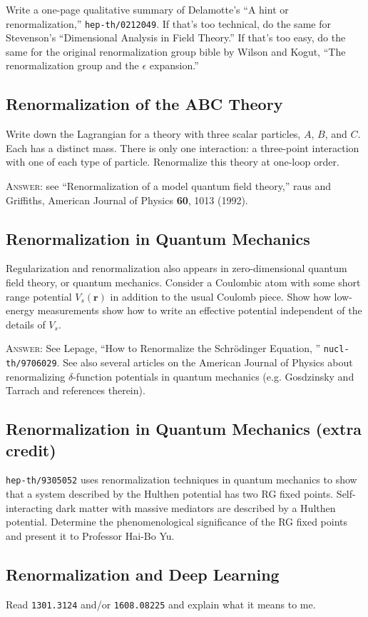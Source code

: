 \documentclass[12pt]{article}
\numberwithin{equation}{subsection}    %
\renewcommand{\vec}[1]{\mathbf{#1}} %
\begin{document}
Write a one-page qualitative summary of Delamotte's ``A hint or renormalization,'' \texttt{hep-th/0212049}. If that's too technical, do the same for Stevenson's ``Dimensional Analysis in Field Theory.''  If that's too easy, do the same for the original renormalization group bible by Wilson and Kogut, ``The renormalization group and the $\epsilon$ expansion.''


\subsection{Renormalization of the ABC Theory}

Write down the Lagrangian for a theory with three scalar particles, $A$, $B$, and $C$. Each has a distinct mass. There is only one interaction: a three-point interaction with one of each type of particle. Renormalize this theory at one-loop order. 

\textsc{Answer}: see ``Renormalization of a model quantum field theory,'' raus and Griffiths, American Journal of Physics \textbf{60}, 1013 (1992).

\subsection{Renormalization in Quantum Mechanics}

Regularization and renormalization also appears in zero-dimensional quantum field theory, or quantum mechanics. Consider a Coulombic atom with some short range potential $V_s(\vec{r})$ in addition to the usual Coulomb piece. Show how low-energy measurements show how to write an effective potential independent of the details of $V_s$. 

\textsc{Answer}: See Lepage, ``How to Renormalize the Schr\"odinger Equation, '' \texttt{nucl-th/9706029}. See also several articles on the American Journal of Physics about renormalizing $\delta$-function potentials in quantum mechanics (e.g. Gosdzinsky and Tarrach and references therein).

\subsection{Renormalization in Quantum Mechanics (extra credit)}

\texttt{hep-th/9305052} uses renormalization techniques in quantum mechanics to show that a system described by the Hulthen potential has two RG fixed points. Self-interacting dark matter with massive mediators are described by a Hulthen potential. Determine the phenomenological significance of the RG fixed points and present it to Professor Hai-Bo Yu.

\subsection{Renormalization and Deep Learning}

Read \texttt{1301.3124} and/or \texttt{1608.08225} and explain what it means to me.
\end{document}
